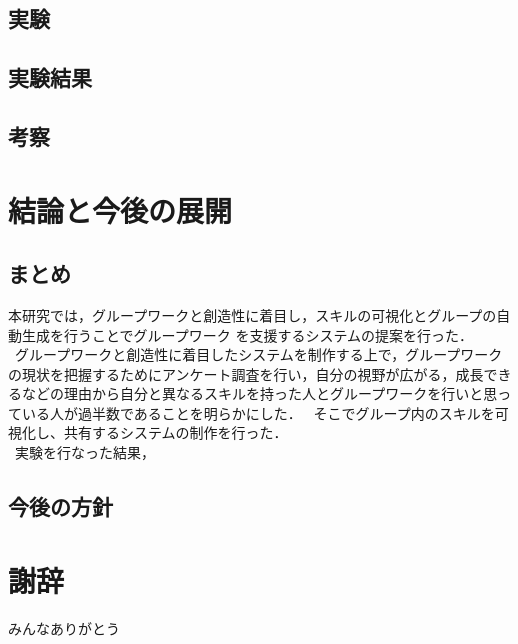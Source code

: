 \documentclass{funthesis}
\begin{document}
\section{実験}

\section{実験結果}




\section{考察}



\chapter{結論と今後の展開}
\section{まとめ}
本研究では，グループワークと創造性に着目し，スキルの可視化とグループの自動生成を行うことでグループワーク
を支援するシステムの提案を行った．\\
\ グループワークと創造性に着目したシステムを制作する上で，グループワークの現状を把握するためにアンケート調査を行い，自分の視野が広がる，成長できるなどの理由から自分と異なるスキルを持った人とグループワークを行いと思っている人が過半数であることを明らかにした．
\ そこでグループ内のスキルを可視化し、共有するシステムの制作を行った．\\
\ 実験を行なった結果，

\section{今後の方針}


\chapter*{謝辞}

みんなありがとう
\end{document}
